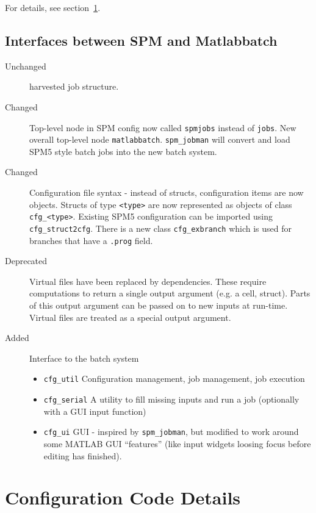 For details, see section~\ref{sec:code}. 

\subsection{Interfaces between SPM and Matlabbatch}
\label{sec:overinter}

\begin{description}
\item[Unchanged] harvested job structure.
\item[Changed] Top-level node in SPM config now called \verb|spmjobs| instead
  of \verb|jobs|. New overall top-level node
  \verb|matlabbatch|. \verb|spm_jobman| will convert and load SPM5 style batch
  jobs into the new batch system.
\item[Changed] Configuration file syntax - instead of structs, configuration
  items are now objects. Structs of type \verb|<type>| are now represented as
  objects of class \verb|cfg_<type>|. Existing SPM5 configuration can
  be imported using \verb|cfg_struct2cfg|. There is a new class
  \verb|cfg_exbranch| which is used for branches that have a \verb|.prog|
  field.
\item[Deprecated] Virtual files have been replaced by dependencies. These
  require computations to return a single output argument (e.g. a cell,
  struct). Parts of this output argument can be passed on to new inputs at
  run-time. Virtual files are treated as a special output argument.
\item[Added] Interface to the batch system
  \begin{itemize}
  \item \verb|cfg_util| Configuration management, job management, job
    execution
  \item \verb|cfg_serial| A utility to fill missing inputs and run a job
    (optionally with a GUI input function)
  \item \verb|cfg_ui| GUI - inspired by \verb|spm_jobman|, but modified to
    work around some MATLAB GUI ``features'' (like input widgets loosing focus
    before editing has finished).
  \end{itemize}

\end{description}

\section{Configuration Code Details}
\label{sec:code}

